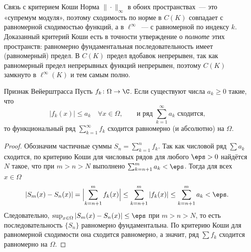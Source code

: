 \begin{Remark}{Связь с критерием Коши}{}
	Норма $\|\cdot\|_\infty$ в обоих пространствах~--- это «супремум модуля», поэтому сходимость по норме в $C(K)$ совпадает с равномерной сходимостью функций, а в $\ell^\infty$~--- с равномерной по индексу $k$. Доказанный критерий Коши есть в точности утверждение о \emph{полноте} этих пространств: равномерно фундаментальная последовательность имеет (равномерный) предел. В $C(K)$ предел вдобавок непрерывен, так как равномерный предел непрерывных функций непрерывен, поэтому $C(K)$ замкнуто в $\ell^\infty(K)$ и тем самым полно.
\end{Remark}

\begin{Theorem}{Признак Вейерштрасса}{}
	Пусть $f_k \colon \Omega \to \C$. Если существуют числа $a_k \ge 0$ такие, что
	\[
	|f_k(x)| \le a_k \quad \forall x \in \Omega, \qquad \text{и ряд } \sum_{k=1}^{\infty} a_k \text{ сходится,}
	\]
	то функциональный ряд $\sum_{k=1}^{\infty} f_k$ сходится равномерно (и абсолютно) на $\Omega$.
\end{Theorem}

\begin{proof}
	Обозначим частичные суммы $S_n = \sum_{k=1}^{n} f_k$. Так как числовой ряд $\sum a_k$ сходится, по критерию Коши для числовых рядов для любого $\eps > 0$ найдётся $N$ такое, что при $m > n > N$ выполнено $\sum_{k=n+1}^{m} a_k < \eps$. Тогда для всех $x \in \Omega$
	\[
	|S_m(x) - S_n(x)| = \Bigl| \sum_{k=n+1}^{m} f_k(x) \Bigr| \le \sum_{k=n+1}^{m} |f_k(x)| \le \sum_{k=n+1}^{m} a_k < \eps.
	\]
	Следовательно, $\sup_{x \in \Omega} |S_m(x) - S_n(x)| \le \eps$ при $m > n > N$, то есть последовательность $\{S_n\}$ равномерно фундаментальна. По критерию Коши для равномерной сходимости она сходится равномерно, а значит, ряд $\sum f_k$ сходится равномерно на $\Omega$.
\end{proof}
